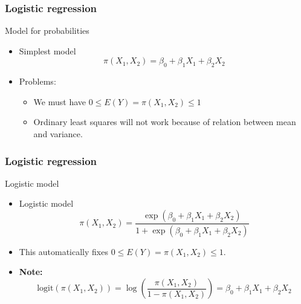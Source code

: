 \documentclass[handout]{beamer}
\begin{document}

   \begin{frame} \frametitle{Logistic regression}

   \begin{block}
       {Model for probabilities}
       \begin{itemize}
       \item Simplest model
   $$
   \pi(X_1,X_2) = \beta_0 + \beta_1 X_1 + \beta_2 X_2
   $$

   \item Problems:
     \begin{itemize}
     \item We must have $0 \leq E(Y) = \pi(X_1,X_2) \leq 1$

     \item Ordinary least squares will not work because of relation
   between mean and variance.
     \end{itemize}
       \end{itemize}
   \end{block}
   \end{frame}


   \begin{frame} \frametitle{Logistic regression}

   \begin{block}
       {Logistic model}
       \begin{itemize}
       \item Logistic model
   $$
   \pi(X_1,X_2) = \frac{\exp(\beta_0 + \beta_1 X_1 + \beta_2 X_2)}{1 + \exp(\beta_0 + \beta_1 X_1 + \beta_2 X_2)}
   $$

   \item This automatically fixes $0 \leq E(Y) = \pi(X_1,X_2) \leq 1$.


   \item {\bf Note:}
   $$
   \text{logit}(\pi(X_1, X_2)) = \log\left(\frac{\pi(X_1, X_2)}{1 - \pi(X_1,X_2)}\right) = \beta_0 + \beta_1 X_1 + \beta_2 X_2
   $$

       \end{itemize}
   \end{block}
   \end{frame}

\end{document}
